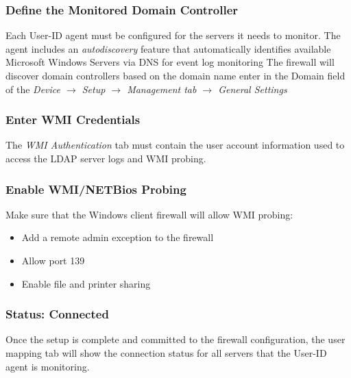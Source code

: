 \subsubsection{Define the Monitored Domain Controller}
Each User-ID agent must be configured for the servers it needs to monitor.
The agent includes an \textit{autodiscovery} feature that automatically identifies available Microsoft Windows Servers via DNS for event log monitoring
The firewall will discover domain controllers based on the domain name enter in the Domain field of the 
\textit{Device $\rightarrow$ Setup $\rightarrow$ Management tab $\rightarrow$ General Settings}

\subsubsection{Enter WMI Credentials}
The \textit{WMI Authentication} tab must contain the user account information used to access the LDAP server logs and WMI probing.

\subsubsection{Enable WMI/NETBios Probing}
Make sure that the Windows client firewall will allow WMI probing:
\begin{itemize}
    \item Add a remote admin exception to the firewall
    \item Allow port 139
    \item Enable file and printer sharing
\end{itemize}

\subsubsection{Status: Connected}
Once the setup is complete and committed to the firewall configuration, the user mapping tab will show the connection status for all servers that the User-ID agent is monitoring.

